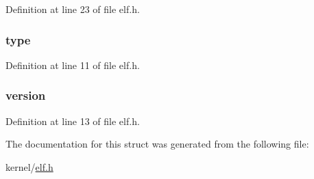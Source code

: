 Definition at line 23 of file elf.\-h.

\hypertarget{structelfhdr_afa7787a68eb26fb33dc369c00db629ca}{
\subsubsection[{type}]{ type}}\label{structelfhdr_afa7787a68eb26fb33dc369c00db629ca}


Definition at line 11 of file elf.\-h.

\hypertarget{structelfhdr_acb7e2a1d2504d82c52a9fa9b00bea040}{
\subsubsection[{version}]{ version}}\label{structelfhdr_acb7e2a1d2504d82c52a9fa9b00bea040}


Definition at line 13 of file elf.\-h.



The documentation for this struct was generated from the following file\-:\begin{DoxyCompactItemize}
\item 
kernel/\hyperlink{elf_8h}{elf.\-h}\end{DoxyCompactItemize}
